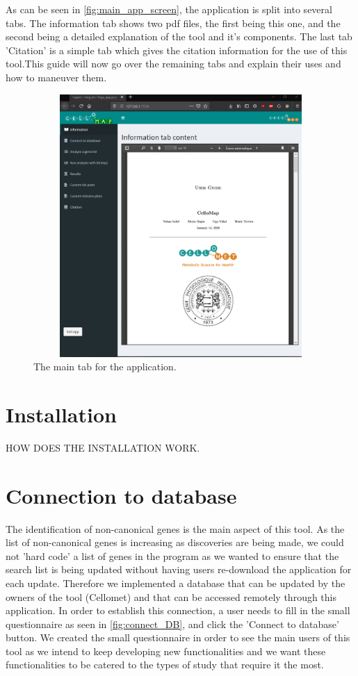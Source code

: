 \documentclass[11pt]{article}
\begin{document}
As can be seen in \autoref{fig:main_app_screen}, the application is split into several tabs. The information tab shows two pdf files, the first being this one, and the second being a detailed explanation of the tool and it's components. The last tab 'Citation' is a simple tab which gives the citation information for the use of this tool.This guide will now go over the remaining tabs and explain their uses and how to maneuver them.
\begin{figure}[h!]
\centering
\includegraphics[width=15cm,height=10cm,keepaspectratio]{main_app_screen.png}
\caption{The main tab for the application.}
\label{fig:main_app_screen}
\end{figure}

\section{Installation}
HOW DOES THE INSTALLATION WORK.

\section{Connection to database}
The identification of non-canonical genes is the main aspect of this tool. As the list of non-canonical genes is increasing as discoveries are being made, we could not 'hard code' a list of genes in the program as we wanted to ensure that the search list is being updated without having users re-download the application for each update. Therefore we implemented a database that can be updated by the owners of the tool (Cellomet) and that can be accessed remotely through this application.
In order to establish this connection, a user needs to fill in the small questionnaire as seen in \autoref{fig:connect_DB}, and click the 'Connect to database' button. We created the small questionnaire in order to see the main users of this tool as we intend to keep developing new functionalities and we want these functionalities to be catered to the types of study that require it the most.
\end{document}
